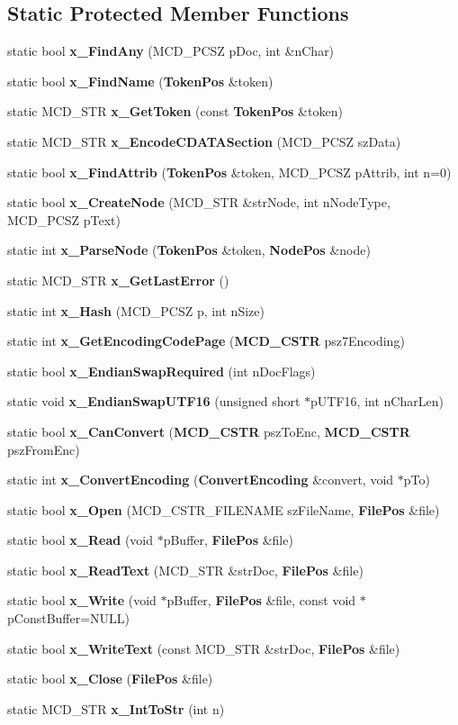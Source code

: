 \subsection*{Static Protected Member Functions}
\begin{CompactItemize}
\item 
static bool {\bf x\_\-FindAny} (MCD\_\-PCSZ pDoc, int \&nChar)
\item 
static bool {\bf x\_\-FindName} ({\bf TokenPos} \&token)
\item 
static MCD\_\-STR {\bf x\_\-GetToken} (const {\bf TokenPos} \&token)
\item 
static MCD\_\-STR {\bf x\_\-EncodeCDATASection} (MCD\_\-PCSZ szData)
\item 
static bool {\bf x\_\-FindAttrib} ({\bf TokenPos} \&token, MCD\_\-PCSZ pAttrib, int n=0)
\item 
static bool {\bf x\_\-CreateNode} (MCD\_\-STR \&strNode, int nNodeType, MCD\_\-PCSZ pText)
\item 
static int {\bf x\_\-ParseNode} ({\bf TokenPos} \&token, {\bf NodePos} \&node)
\item 
static MCD\_\-STR {\bf x\_\-GetLastError} ()
\item 
static int {\bf x\_\-Hash} (MCD\_\-PCSZ p, int nSize)
\item 
static int {\bf x\_\-GetEncodingCodePage} ({\bf MCD\_\-CSTR} psz7Encoding)
\item 
static bool {\bf x\_\-EndianSwapRequired} (int nDocFlags)
\item 
static void {\bf x\_\-EndianSwapUTF16} (unsigned short $\ast$pUTF16, int nCharLen)
\item 
static bool {\bf x\_\-CanConvert} ({\bf MCD\_\-CSTR} pszToEnc, {\bf MCD\_\-CSTR} pszFromEnc)
\item 
static int {\bf x\_\-ConvertEncoding} ({\bf ConvertEncoding} \&convert, void $\ast$pTo)
\item 
static bool {\bf x\_\-Open} (MCD\_\-CSTR\_\-FILENAME szFileName, {\bf FilePos} \&file)
\item 
static bool {\bf x\_\-Read} (void $\ast$pBuffer, {\bf FilePos} \&file)
\item 
static bool {\bf x\_\-ReadText} (MCD\_\-STR \&strDoc, {\bf FilePos} \&file)
\item 
static bool {\bf x\_\-Write} (void $\ast$pBuffer, {\bf FilePos} \&file, const void $\ast$pConstBuffer=NULL)
\item 
static bool {\bf x\_\-WriteText} (const MCD\_\-STR \&strDoc, {\bf FilePos} \&file)
\item 
static bool {\bf x\_\-Close} ({\bf FilePos} \&file)
\item 
static MCD\_\-STR {\bf x\_\-IntToStr} (int n)
\end{CompactItemize}
